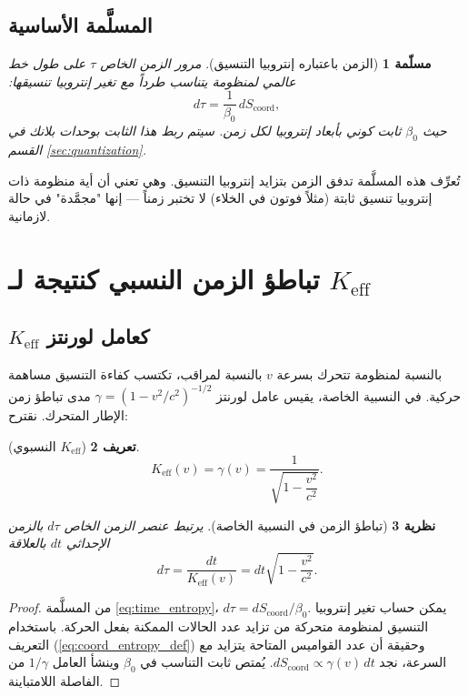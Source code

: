\documentclass[11pt,a4paper]{article}
\newcommand{\Ke}{K_{\mathrm{eff}}}
\newcommand{\Scoord}{S_{\mathrm{coord}}}
\newtheorem{theorem}{نظرية}[section]
\newtheorem{definition}[theorem]{تعريف}
\newtheorem{axiom}[theorem]{مسلّمة}
\begin{document}
	\subsection{المسلَّمة الأساسية}
	
	\begin{axiom}[الزمن باعتباره إنتروبيا التنسيق]
		مرور الزمن الخاص \(\tau\) على طول خط عالمي لمنظومة يتناسب طرداً مع تغير إنتروبيا تنسيقها:
		\begin{equation}
			d\tau = \frac{1}{\beta_0} \, d\Scoord,
			\label{eq:time_entropy}
		\end{equation}
		حيث \(\beta_0\) ثابت كوني بأبعاد إنتروبيا لكل زمن. سيتم ربط هذا الثابت بوحدات بلانك في القسم \ref{sec:quantization}.
	\end{axiom}
	
	تُعرِّف هذه المسلَّمة تدفق الزمن بتزايد إنتروبيا التنسيق. وهي تعني أن أية منظومة ذات إنتروبيا تنسيق ثابتة (مثلاً فوتون في الخلاء) لا تختبر زمناً — إنها "مجمَّدة" في حالة لازمانية.
	
	\section{تباطؤ الزمن النسبي كنتيجة لـ \(\Ke\)}
	\label{sec:sr}
	
	\subsection{\(\Ke\) كعامل لورنتز}
	
	بالنسبة لمنظومة تتحرك بسرعة \(v\) بالنسبة لمراقب، تكتسب كفاءة التنسيق مساهمة حركية. في النسبية الخاصة، يقيس عامل لورنتز \(\gamma = (1-v^2/c^2)^{-1/2}\) مدى تباطؤ زمن الإطار المتحرك. نقترح:
	\begin{definition}[\(\Ke\) النسبوي]
		\[
		\Ke(v) = \gamma(v) = \frac{1}{\sqrt{1-\dfrac{v^2}{c^2}}}.
		\]
	\end{definition}
	
	\begin{theorem}[تباطؤ الزمن في النسبية الخاصة]
		يرتبط عنصر الزمن الخاص \(d\tau\) بالزمن الإحداثي \(dt\) بالعلاقة
		\begin{equation}
			d\tau = \frac{dt}{\Ke(v)} = dt\sqrt{1-\frac{v^2}{c^2}}.
		\end{equation}
	\end{theorem}
	
	\begin{proof}
		من المسلَّمة \ref{eq:time_entropy}، \(d\tau = d\Scoord/\beta_0\). يمكن حساب تغير إنتروبيا التنسيق لمنظومة متحركة من تزايد عدد الحالات الممكنة بفعل الحركة. باستخدام التعريف (\ref{eq:coord_entropy_def}) وحقيقة أن عدد القواميس المتاحة يتزايد مع السرعة، نجد \(d\Scoord \propto \gamma(v)\, dt\). يُمتص ثابت التناسب في \(\beta_0\) وينشأ العامل \(1/\gamma\) من الفاصلة اللامتباينة.
	\end{proof}
	
\end{document}
